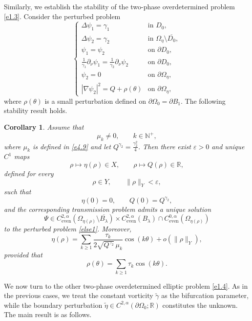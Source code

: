 \documentclass[reqno]{amsart}
\numberwithin{equation}{section}
\newtheorem{corollary}[theorem]{Corollary}
\numberwithin{equation}{section}
\numberwithin{equation}{section}
\begin{document}
Similarly, we establish the stability of the two-phase overdetermined problem \eqref{e1.3}. Consider the perturbed problem
\begin{equation}\label{else1}
\begin{cases}
\Delta \psi_1 = \gamma_1 & \text{in } D_0, \\
\Delta \psi_2 = \gamma_2 & \text{in } \Omega_\eta \setminus \overline{D_0}, \\
\psi_1 = \psi_2 & \text{on } \partial D_0, \\
\frac{1}{\gamma_1} \partial_\nu \psi_1 = \frac{1}{\gamma_2} \partial_\nu \psi_2 & \text{on } \partial D_0, \\
\psi_2 = 0 & \text{on } \partial \Omega_\eta, \\
|\nabla \psi_2|^2 = Q + \rho(\theta) & \text{on } \partial \Omega_\eta,
\end{cases}
\end{equation}
where \(\rho(\theta)\) is a small perturbation defined on
\(\partial \Omega_0 = \partial B_1\).
The following stability result holds.
\begin{corollary}\label{co1}
Assume that
\[ \mu_k\neq0, \qquad k\in\mathbb N^+, \]
where $\mu_k$ is defined in \eqref{e4.9} and let $Q^{\gamma_2} = \frac{\gamma_2^2}{4}$.
Then there exist $\varepsilon>0$ and unique $C^1$ maps
\[ \rho\longmapsto\eta(\rho)\in X, \qquad \rho\longmapsto Q(\rho)\in\mathbb R, \]
defined for every
\[ \rho\in Y, \qquad \|\rho\|_Y<\varepsilon, \]
such that
\[ \eta(0)=0, \qquad Q(0)=Q^{\gamma_2}, \]
and the corresponding transmission problem admits a unique solution
$$\Psi \in C_\mathrm{even}^{2,\alpha}(\Omega_{\eta(\rho)} \setminus \overline{B_\lambda}) \times C_\mathrm{even}^{2,\alpha}(B_\lambda) \cap C_\mathrm{even}^{0,\alpha}(\Omega_{\eta(\rho)})$$
to the perturbed problem \eqref{else1}. Moreover,
\[ \eta(\rho) = \sum_{k\ge1} \frac{\tau_k} {2\sqrt{Q^{\gamma_2}}\,\mu_k} \cos(k\theta) + o(\|\rho\|_Y), \]
provided that
\[ \rho(\theta) = \sum_{k\ge1} \tau_k\cos(k\theta). \]
\end{corollary}

We now turn to the other two-phase overdetermined elliptic problem \eqref{e1.4}. As in the previous cases, we treat the constant vorticity \(\widetilde{\gamma}\) as the bifurcation parameter, while the  boundary perturbation \(\widetilde{\eta} \in C^{2,\alpha}(\partial \Omega_0; \mathbb{R})\) constitutes the unknown. The main result is as follows.
\end{document}
